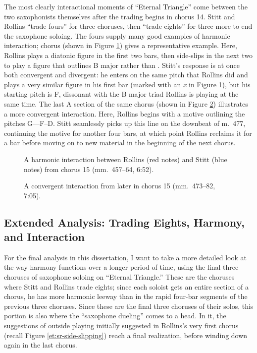 The most clearly interactional moments of ``Eternal Triangle'' come between
the two saxophonists themselves after the trading begins in chorus 14. Stitt
and Rollins ``trade fours'' for three choruses, then ``trade eights'' for
three more to end the saxophone soloing. The fours supply many good examples
of harmonic interaction; chorus  (shown in Figure
\ref{et:trading-c15-divergent}) gives a representative example. Here, Rollins
plays a diatonic figure in the first two bars, then side-slips in the next two
to play a figure that outlines B major rather than \Bflat. Stitt's response is
at once both convergent and divergent: he enters on the same pitch that
Rollins did and plays a very similar figure in his first bar (marked with an
\textit{x} in Figure \ref{et:trading-c15-divergent}), but his starting pitch
is F\nat, dissonant with the B major triad Rollins is playing at the same
time. The last A section of the same chorus (shown in Figure
\ref{et:trading-c15-convergent}) illustrates a more convergent interaction.
Here, Rollins begins with a motive outlining the pitches G--\Gflat--F--D.
Stitt seamlessly picks up this line on the downbeat of m.~477, continuing the
motive for another four bars, at which point Rollins reclaims it for a bar
before moving on to new material in the beginning of the next chorus.

\begin{figure}[tbp]
  \caption[A harmonic interaction between Rollins and Stitt from chorus 15.]{%
    A harmonic interaction between Rollins (red notes) and Stitt (blue notes)
    from chorus 15 (mm.~457--64, 6:52).}
  \label{et:trading-c15-divergent}
\end{figure}

\begin{figure}[tbp]
  \caption[A convergent interaction between Rollins and Stitt from later in
  chorus 15.]{%
    A convergent interaction from later in chorus 15 (mm.~473--82, 7:05).}
  \label{et:trading-c15-convergent}
\end{figure}

\FloatBarrier
\subsection{Extended Analysis: Trading Eights, Harmony, and Interaction}

For the final analysis in this dissertation, I want to take a more detailed
look at the way harmony functions over a longer period of time, using the
final three choruses of saxophone soloing on ``Eternal Triangle.'' These are
the choruses where Stitt and Rollins trade eights; since each soloist gets an
entire section of a chorus, he has more harmonic leeway than in the rapid
four-bar segments of the previous three choruses. Since these are the final
three choruses of their solos, this portion is also where the ``saxophone
dueling'' comes to a head. In it, the suggestions of outside playing initially
suggested in Rollins's very first chorus (recall Figure
\ref{et:sr-side-slipping}) reach a final realization, before winding down
again in the last chorus.

